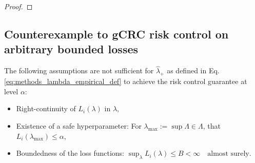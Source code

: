 \begin{proof}



\end{proof}


\subsection{Counterexample to gCRC risk control on arbitrary bounded losses}
\label{app:counterexample}


\begin{proposition}
    
    The following assumptions are not sufficient for $\hat\lambda_+$ as defined in Eq. \eqref{eq:methods_lambda_empirical_def} to achieve the risk control guarantee at level $\alpha$:
    \begin{itemize}
        \item Right-continuity of $L_i(\lambda)$ in $\lambda$,
        \item Existence of a safe hyperparameter: For $\lambda_{\max}:=\sup\Lambda\in \Lambda$, that $L_i(\lambda_{\max})\leq \alpha$,
        \item Boundedness of the loss functions: $\sup_{\lambda}L_i(\lambda)\leq B < \infty \quad \text{almost surely}$.
    \end{itemize}
    
    
\end{proposition}


